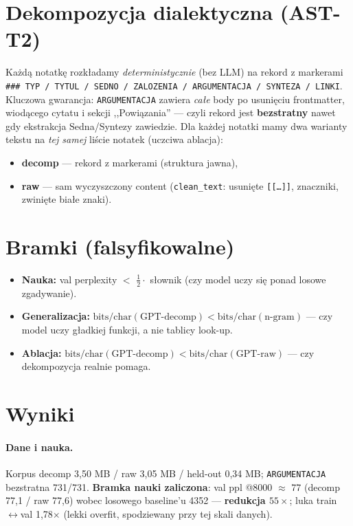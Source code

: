 \documentclass[11pt]{article}
\begin{document}
\section{Dekompozycja dialektyczna (AST-T2)}
Każdą notatkę rozkładamy \emph{deterministycznie} (bez LLM) na rekord z markerami
\texttt{\#\#\# TYP / TYTUL / SEDNO / ZALOZENIA / ARGUMENTACJA / SYNTEZA / LINKI}. Kluczowa gwarancja:
\texttt{ARGUMENTACJA} zawiera \emph{całe} body po usunięciu frontmatter, wiodącego cytatu i sekcji ,,Powiązania''
--- czyli rekord jest \textbf{bezstratny} nawet gdy ekstrakcja Sedna/Syntezy zawiedzie. Dla każdej notatki mamy dwa
warianty tekstu na \emph{tej samej} liście notatek (uczciwa ablacja):
\begin{itemize}
  \item \textbf{decomp} --- rekord z markerami (struktura jawna),
  \item \textbf{raw} --- sam wyczyszczony content (\texttt{clean\_text}: usunięte \texttt{[[\ldots]]}, znaczniki,
  zwinięte białe znaki).
\end{itemize}

\section{Bramki (falsyfikowalne)}
\begin{itemize}
  \item \textbf{Nauka:} val perplexity $<$ $\tfrac12\cdot$ słownik (czy model uczy się ponad losowe zgadywanie).
  \item \textbf{Generalizacja:} $\text{bits/char}(\text{GPT-decomp}) < \text{bits/char}(\text{n-gram})$ --- czy model
  uczy gładkiej funkcji, a nie tablicy look-up.
  \item \textbf{Ablacja:} $\text{bits/char}(\text{GPT-decomp}) < \text{bits/char}(\text{GPT-raw})$ --- czy
  dekompozycja realnie pomaga.
\end{itemize}

\section{Wyniki}
\paragraph{Dane i nauka.} Korpus decomp 3{,}50 MB / raw 3{,}05 MB / held-out 0{,}34 MB; \texttt{ARGUMENTACJA}
bezstratna 731/731. \textbf{Bramka nauki zaliczona}: val ppl @8000 $\approx$ 77 (decomp 77{,}1 / raw 77{,}6) wobec
losowego baseline'u 4352 --- \textbf{redukcja $55\times$}; luka train$\leftrightarrow$val 1{,}78$\times$ (lekki
overfit, spodziewany przy tej skali danych).
\end{document}
